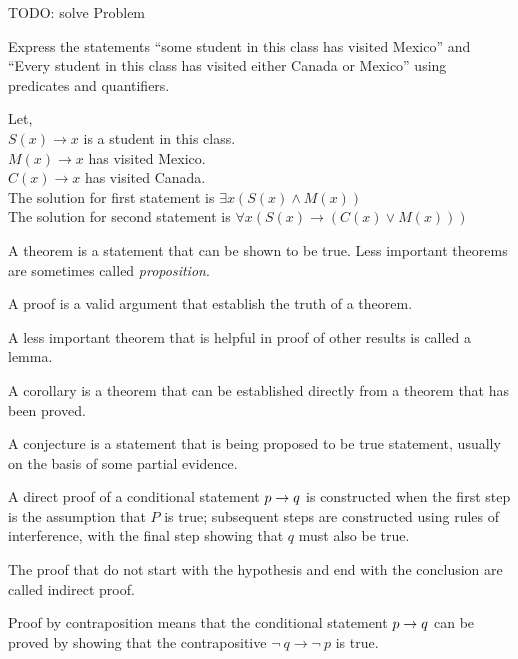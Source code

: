 \documentclass[../main-sheet.tex]{subfiles}
\begin{document}
TODO: solve Problem
\newpage
\begin{prob}
    Express the statements ``some student in this class has visited Mexico'' and ``Every student in this class has visited either Canada or Mexico'' using predicates and quantifiers.
\end{prob}
\begin{soln}
    Let,\\
    \(S(x)\to x\) is a student in this class.\\
    \(M(x)\to x\) has visited Mexico.\\
    \(C(x)\to x\) has visited Canada.\\
    The solution for first statement is \(\exists x (S(x)\wedge M(x))\)\\
    The solution for second statement is \(\forall x (S(x)\to (C(x)\vee M(x)))\)
\end{soln}
\begin{defn}[Theorem]
    A theorem is a statement that can be shown to be true.
    Less important theorems are sometimes called \emph{proposition}.
\end{defn}
\begin{defn}[Proof]
    A proof is a valid argument that establish the truth of a theorem.
\end{defn}
\begin{defn}[Lemma]
    A less important theorem that is helpful in proof of other results is called a lemma.
\end{defn}
\begin{defn}[Corollary]
    A corollary is a theorem that can be established directly from a theorem that has been proved.
\end{defn}
\begin{defn}[Conjucture]
    A conjecture is a statement that is being proposed to be true statement, usually on the basis of some partial evidence.
\end{defn}
\begin{defn}
    A direct proof of a conditional statement \(p \to q\) is constructed when the first step is the assumption that $ P $ is true; subsequent steps are constructed using rules of interference, with the final step showing that \(q\) must also be true.
\end{defn}
\begin{defn}
    The proof that do not start with the hypothesis and end with the conclusion are called indirect proof.
\end{defn}
\begin{defn}
    Proof by contraposition means that the conditional statement \(p \to q\) can be proved by showing that the contrapositive \(\neg\ q\to\neg\ p\) is true.
\end{defn}
\end{document}
